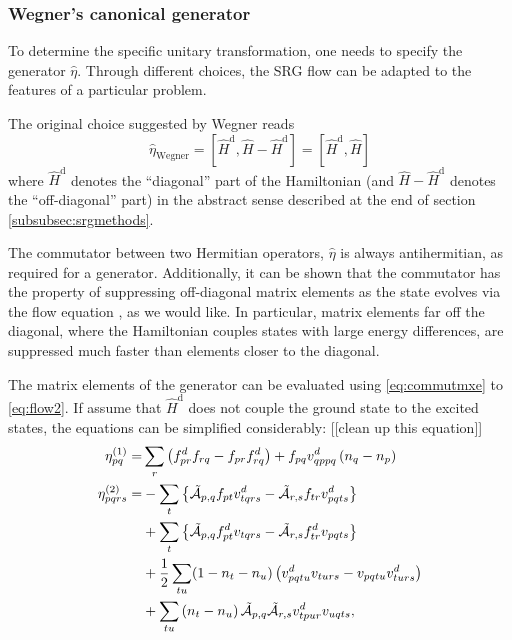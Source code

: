 \documentclass[amsmath, amssymb, aps, floatfix, nofootinbib, preprintnumbers,showpacs, superscriptaddress, twocolumn]{revtex4-1}
\begin{document}
\subsubsection{Wegner's canonical generator}

To determine the specific unitary transformation, one needs to specify the generator $\hat{\eta}$.  Through different choices, the SRG flow can be adapted to the features of a particular problem.

The original choice suggested by Wegner \cite{PhysRepWegner0} reads
\begin{equation}
  \hat{\eta}_{\text{Wegner}}
  = [\hat{H}^{\text{d}}, \hat{H} - \hat{H}^{\text{d}}]
  = [\hat{H}^{\text{d}}, \hat{H}]
  \label{eq:etaWegner}
\end{equation}
where $\hat{H}^{\text{d}}$ denotes the ``diagonal'' part of the Hamiltonian (and $\hat{H} - \hat{H}^{\text{d}}$ denotes the ``off-diagonal'' part) in the abstract sense described at the end of section \ref{subsubsec:srgmethods}.

The commutator between two Hermitian operators, $\hat{\eta}$ is always antihermitian, as required for a generator.  Additionally, it can be shown that the commutator has the property of suppressing off-diagonal matrix elements as the state evolves via the flow equation \cite{kehrein2006flow}, as we would like.  In particular, matrix elements far off the diagonal, where the Hamiltonian couples states with large energy differences, are suppressed much faster than elements closer to the diagonal.

The matrix elements of the generator can be evaluated using \eqref{eq:commutmxe} to \eqref{eq:flow2}.  If assume that $\hat{H}^{\text{d}}$ does not couple the ground state to the excited states, the equations can be simplified considerably: [[clean up this equation]]
\begin{align*}
\eta_{pq}^{(1)} = & \sum_{r} \left(f_{pr}^d f_{rq} - f_{pr} f_{rq}^d \right) + f_{pq} v_{qppq}^d \left( n_q - n_p \right) \\ \eta_{pqrs}^{(2)} = & - \sum_t \left\lbrace \tilde{\mathcal{A}}_{p, q} f_{pt} v_{tqrs}^d - \tilde{\mathcal{A}}_{r, s} f_{tr} v_{pqts}^d \right\rbrace \notag \\ & + \sum_t \left\lbrace \tilde{\mathcal{A}}_{p, q} f_{pt}^d v_{tqrs} - \tilde{\mathcal{A}}_{r, s} f_{tr}^d v_{pqts} \right\rbrace \notag \\ & + \frac{1}{2} \sum_{tu} (1 - n_t - n_u) \left( v_{pqtu}^d v_{turs} - v_{pqtu} v_{turs}^d \right) \notag \\ & + \sum_{tu} \left( n_t - n_u \right) \tilde{\mathcal{A}}_{p, q} \tilde{\mathcal{A}}_{r, s} v_{tpur}^d v_{uqts},
\end{align*}
\end{document}
